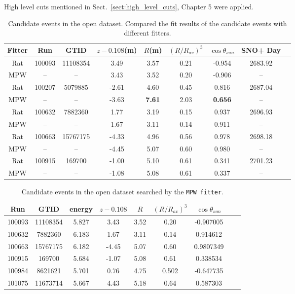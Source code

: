 High level cuts mentioned in Sect.~\ref{sect:high_level_cuts}, Chapter 5 were applied.

\begin{table}[ht]
	\centering
	\caption[Candidate events in the open dataset.]{Candidate events in the open dataset. Compared the fit results of the candidate events with different fitters.}
	\label{opendata}
	\begin{tabular*}{150mm}{c@{\extracolsep{\fill}}cccccccc}
		\toprule
		Fitter &	Run &  GTID &  $z-0.108$(m) & $R$(m)& $(R/R_{av})^3$ & $\cos\theta_{sun}$ & SNO+ Day\\
		\hline 
		Rat & 100093 &11108354 &3.49 &3.57 &0.21 &-0.954 &2683.92 \\	
		MPW &  --& --& 3.43 &	3.52 &	0.20	& -0.906 & --\\
		Rat &	100207 &5079885 &-2.61 &4.60 &0.45 &0.816 &2687.04\\
		MPW &	 --& --& -3.63 & \textbf{7.61} &	2.03 & \textbf{0.656} & -- \\
		Rat &100632 &7882360 &1.77 &3.19 &0.15 &0.937 &2696.93\\
		MPW &    --& --&  1.67 & 3.11 &	0.14 & 0.911 & -- \\
		Rat &100663 &15767175 &-4.33& 4.96 &0.56 &0.978 &2698.18\\
		MPW & --& -- &-4.45 &	5.07 &	0.60 &	0.980 & -- \\
		Rat &100915 &169700 &-1.00 &5.10 &0.61 &0.341 &2701.23\\
		MPW &	--& --& -1.08 &	5.08 &	0.61 &	0.337 & -- \\	
		\bottomrule
	\end{tabular*}
\end{table}

\begin{table}[ht]
	\centering
	\caption{Candidate events in the open dataset searched by the \texttt{MPW fitter}.}
	\label{opendataMPW}
	\begin{tabular*}{150mm}{c@{\extracolsep{\fill}}cccccccc}
		\toprule
		Run & GTID & energy & $z-0.108$ & $R$ & $(R/R_{av})^3$ & $\cos\theta_{sun}$\\
		\hline 
		100093 &	11108354	&5.827 & 3.43 & 3.52 & 0.20 & -0.907005\\
		100632&	7882360    &6.183& 1.67 &3.11 &0.14 &0.914612\\
		100663&	15767175   &	6.182 & -4.45 &5.07 &0.60&	0.9807349\\
		100915&	169700   &	5.684 &	-1.07 &5.08 &0.61&0.338534\\
		100984&	8621621&	5.701 & 0.76 &4.75 &0.502&-0.647735\\
		101075&	11673714&	5.667 &4.43 &5.18 &0.64& 0.587303\\
		\bottomrule
	\end{tabular*}
\end{table}

